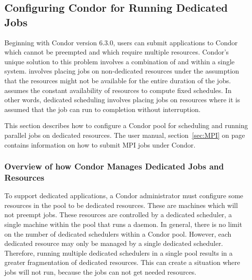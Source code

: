 \subsection{\label{sec:Config-Dedicated-Jobs}
Configuring Condor for Running Dedicated Jobs} 


Beginning with Condor version 6.3.0, users can submit applications to
Condor which cannot be preempted and which require multiple resources.
Condor's unique solution to this problem involves a combination of
 and  within
a single system.
 involves placing jobs on non-dedicated
resources under the assumption that the resources might not be
available for the entire duration of the jobs.
 assumes the constant availability of
resources to compute fixed schedules.
In other words, dedicated scheduling involves placing jobs on
resources where it is assumed that the job can run to completion
without interruption.

This section describes how to configure a Condor pool for scheduling
and running parallel jobs on dedicated resources.
The user manual, section~\ref{sec:MPI} on page~\pageref{sec:MPI}
contains information on how to submit MPI jobs under Condor.


\subsubsection{\label{sec:Overview-Dedicated-Condor}
Overview of how Condor Manages Dedicated Jobs and Resources}

To support dedicated applications, a Condor administrator must
configure some resources in the pool to be dedicated resources.
These are machines which will not preempt jobs.
These resources are controlled by a dedicated scheduler, a
single machine within the pool that runs a  daemon.
In general, there is no limit on the number of dedicated schedulers within
a Condor pool.
However, each dedicated resource may only be managed by a single
dedicated scheduler.
Therefore, running multiple dedicated schedulers in a single pool
results in a greater fragmentation of dedicated resources.
This can create a situation where jobs will not run, because the jobs
can not get needed resources.  

